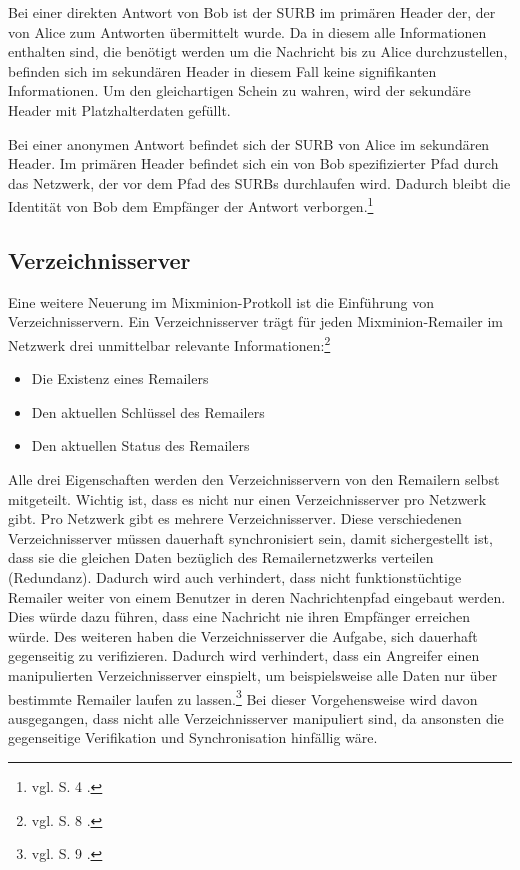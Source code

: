 Bei einer direkten Antwort von Bob ist der SURB im primären Header der, der von Alice zum Antworten übermittelt wurde. Da in diesem alle Informationen enthalten sind, die benötigt werden um die Nachricht bis zu Alice durchzustellen, befinden sich im sekundären Header in diesem Fall keine signifikanten Informationen. Um den gleichartigen Schein zu wahren, wird der sekundäre Header mit Platzhalterdaten gefüllt.

Bei einer anonymen Antwort befindet sich der SURB von Alice im sekundären Header. Im primären Header befindet sich ein von Bob spezifizierter Pfad durch das Netzwerk, der vor dem Pfad des SURBs durchlaufen wird. Dadurch bleibt die Identität von Bob dem Empfänger der Antwort verborgen.\footnote{vgl. S. 4 \cite{mixminion}.}

\subsection{Verzeichnisserver}
Eine weitere Neuerung im Mixminion-Protkoll ist die Einführung von Verzeichnisservern. Ein Verzeichnisserver trägt für jeden Mixminion-Remailer im Netzwerk drei unmittelbar relevante Informationen:\footnote{vgl. S. 8 \cite{mixminion}.}
\begin{itemize}
\item Die Existenz eines Remailers
\item Den aktuellen Schlüssel des Remailers
\item Den aktuellen Status des Remailers
\end{itemize}

Alle drei Eigenschaften werden den Verzeichnisservern von den Remailern selbst mitgeteilt.
Wichtig ist, dass es nicht nur einen Verzeichnisserver pro Netzwerk gibt. Pro Netzwerk gibt es mehrere Verzeichnisserver. Diese verschiedenen Verzeichnisserver müssen dauerhaft synchronisiert sein, damit sichergestellt ist, dass sie die gleichen Daten bezüglich des Remailernetzwerks verteilen (Redundanz). Dadurch wird auch verhindert, dass nicht funktionstüchtige Remailer weiter von einem Benutzer in deren Nachrichtenpfad eingebaut werden. Dies würde dazu führen, dass eine Nachricht nie ihren Empfänger erreichen würde. Des weiteren haben die Verzeichnisserver die Aufgabe, sich dauerhaft gegenseitig zu verifizieren. Dadurch wird verhindert, dass ein Angreifer einen manipulierten Verzeichnisserver einspielt, um beispielsweise alle Daten nur über bestimmte Remailer laufen zu lassen.\footnote{vgl. S. 9 \cite{mixminion}.} Bei dieser Vorgehensweise wird davon ausgegangen, dass nicht alle Verzeichnisserver manipuliert sind, da ansonsten die gegenseitige Verifikation und Synchronisation hinfällig wäre.

